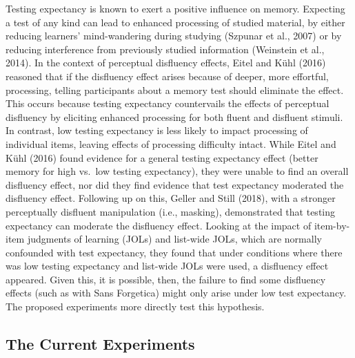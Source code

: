\documentclass[
  english,
  jou]{apa7}
\begin{document}
Testing expectancy is known to exert a positive influence on memory. Expecting a test of any kind can lead to enhanced processing of studied material, by either reducing learners' mind-wandering during studying (Szpunar et al., 2007) or by reducing interference from previously studied information (Weinstein et al., 2014). In the context of perceptual disfluency effects, Eitel and Kühl (2016) reasoned that if the disfluency effect arises because of deeper, more effortful, processing, telling participants about a memory test should eliminate the effect. This occurs because testing expectancy countervails the effects of perceptual disfluency by eliciting enhanced processing for both fluent and disfluent stimuli. In contrast, low testing expectancy is less likely to impact processing of individual items, leaving effects of processing difficulty intact. While Eitel and Kühl (2016) found evidence for a general testing expectancy effect (better memory for high vs.~low testing expectancy), they were unable to find an overall disfluency effect, nor did they find evidence that test expectancy moderated the disfluency effect. Following up on this, Geller and Still (2018), with a stronger perceptually disfluent manipulation (i.e., masking), demonstrated that testing expectancy can moderate the disfluency effect. Looking at the impact of item-by-item judgments of learning (JOLs) and list-wide JOLs, which are normally confounded with test expectancy, they found that under conditions where there was low testing expectancy and list-wide JOLs were used, a disfluency effect appeared. Given this, it is possible, then, the failure to find some disfluency effects (such as with Sans Forgetica) might only arise under low test expectancy. The proposed experiments more directly test this hypothesis.

\hypertarget{the-current-experiments}{%
\subsection{The Current Experiments}\label{the-current-experiments}}
\end{document}

